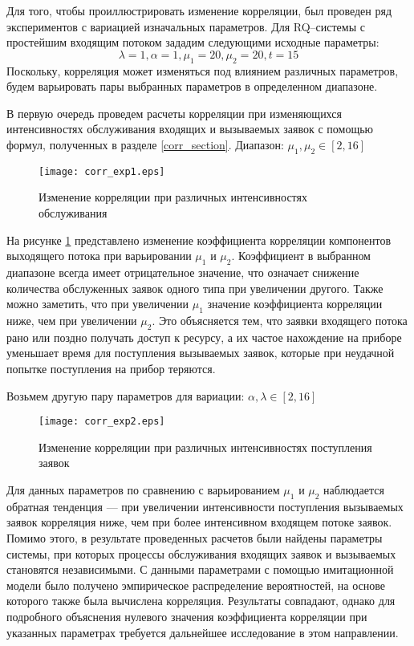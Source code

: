 Для того, чтобы проиллюстрировать изменение корреляции, был проведен ряд экспериментов с вариацией изначальных параметров.
Для RQ--системы с простейшим входящим потоком зададим следующими исходные параметры:
\begin{equation*} \label{simple_summary_input_params_corr}
	\lambda = 1,
	\alpha = 1,
	\mu_{1} = 20,
	\mu_{2} = 20, 
	t = 15
\end{equation*}
Поскольку, корреляция может изменяться под влиянием различных параметров, будем варьировать пары выбранных параметров в определенном диапазоне.

В первую очередь проведем расчеты корреляции при изменяющихся интенсивностях обслуживания входящих и вызываемых заявок с помощью формул, полученных в разделе \ref{corr_section}. Диапазон: $\mu_{1},\mu_{2} \in [2,16]$

\begin{figure}[H]
	\centering
	\texttt{[image: corr\_exp1.eps]}
	\caption{Изменение корреляции при различных интенсивностях обслуживания}
	\label{exps_corr_exp1}
\end{figure} 

На рисунке \ref{exps_corr_exp1} представлено изменение коэффициента корреляции компонентов выходящего потока при варьировании $\mu_{1}$ и $\mu_{2}$. Коэффициент в выбранном диапазоне всегда имеет отрицательное значение, что означает снижение количества обслуженных заявок одного типа при увеличении другого. Также можно заметить, что при увеличении $\mu_{1}$ значение коэффициента корреляции ниже, чем при увеличении $\mu_{2}$. Это объясняется тем, что заявки входящего потока рано или поздно получать доступ к ресурсу, а их частое нахождение на приборе уменьшает время для поступления вызываемых заявок, которые при неудачной попытке поступления на прибор теряются.

Возьмем другую пару параметров для вариации: $\alpha,\lambda \in [2,16]$

\begin{figure}[H]
	\centering
	\texttt{[image: corr\_exp2.eps]}
	\caption{Изменение корреляции при различных интенсивностях поступления заявок}
	\label{exps_corr_exp2}
\end{figure} 

Для данных параметров по сравнению с варьированием $\mu_{1}$ и $\mu_{2}$ наблюдается обратная тенденция --- при увеличении интенсивности поступления вызываемых заявок корреляция ниже, чем при более интенсивном входящем потоке заявок. Помимо этого, в результате проведенных расчетов были найдены параметры системы, при которых процессы обслуживания входящих заявок и вызываемых становятся независимыми. С данными параметрами с помощью имитационной модели было получено эмпирическое распределение вероятностей, на основе которого также была вычислена корреляция. Результаты совпадают, однако для подробного объяснения нулевого значения коэффициента корреляции при указанных параметрах требуется дальнейшее исследование в этом направлении.

